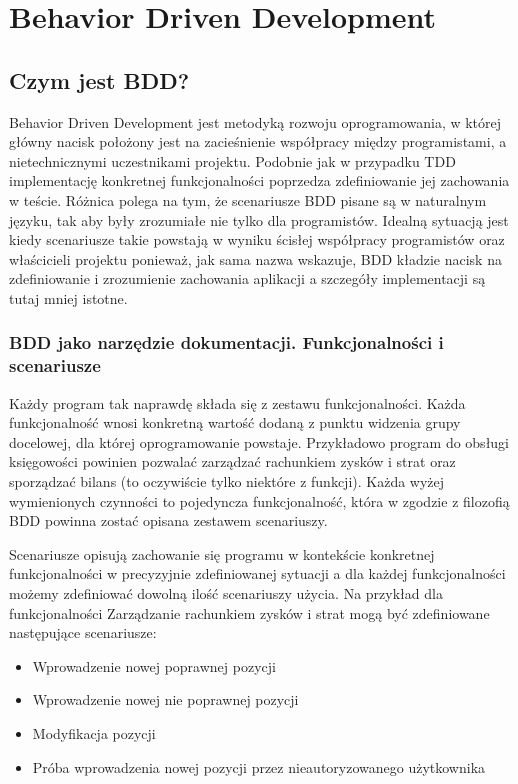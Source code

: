\chapter[Behavior Driven Development]{Behavior Driven Development}
  \section{Czym jest BDD?}
    Behavior Driven Development jest metodyką rozwoju oprogramowania, w której główny nacisk położony jest na zacieśnienie współpracy między programistami, a nietechnicznymi uczestnikami projektu. Podobnie jak w przypadku TDD implementację konkretnej funkcjonalności poprzedza zdefiniowanie jej zachowania w teście. Różnica polega na tym, że scenariusze BDD pisane są w naturalnym języku, tak aby były zrozumiałe nie tylko dla programistów. Idealną sytuacją jest kiedy scenariusze takie powstają w wyniku ścisłej współpracy programistów oraz właścicieli projektu ponieważ, jak sama nazwa wskazuje, BDD kładzie nacisk na zdefiniowanie i zrozumienie zachowania aplikacji a szczegóły implementacji są tutaj mniej istotne.
    \subsection{BDD jako narzędzie dokumentacji. Funkcjonalności i scenariusze}
      Każdy program tak naprawdę składa się z zestawu funkcjonalności. Każda funkcjonalność wnosi konkretną wartość dodaną z punktu widzenia grupy docelowej, dla której oprogramowanie powstaje. Przykładowo program do obsługi księgowości powinien pozwalać zarządzać rachunkiem zysków i strat oraz sporządzać bilans (to oczywiście tylko niektóre z funkcji). Każda wyżej wymienionych czynności to pojedyncza funkcjonalność, która w zgodzie z filozofią BDD powinna zostać opisana zestawem scenariuszy.
      
      Scenariusze opisują zachowanie się programu w kontekście konkretnej funkcjonalności w precyzyjnie zdefiniowanej sytuacji a dla każdej funkcjonalności możemy zdefiniować dowolną ilość scenariuszy użycia. Na przykład dla funkcjonalności Zarządzanie rachunkiem zysków i strat mogą być zdefiniowane następujące scenariusze:
      
      \begin{itemize}
        \item Wprowadzenie nowej poprawnej pozycji
        \item Wprowadzenie nowej nie poprawnej pozycji
        \item Modyfikacja pozycji
        \item Próba wprowadzenia nowej pozycji przez nieautoryzowanego użytkownika
      \end{itemize}
      
